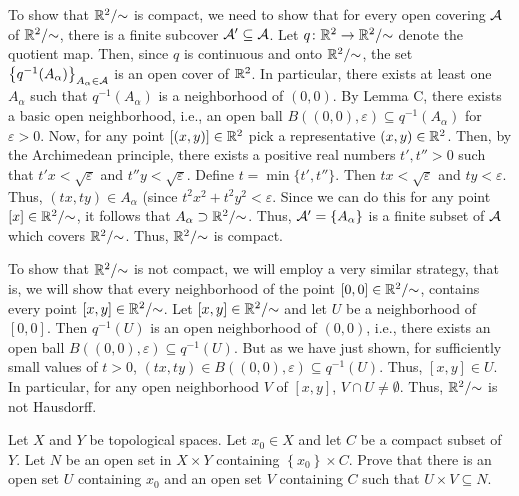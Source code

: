 \begin{solution}
  To show that \(\mathbb{R}^2/{\sim}\) is compact, we need to show that for every
  open covering \(\mathcal{A}\) of \(\mathbb{R}^2/{\sim}\), there is a finite subcover
  \(\mathcal{A}'\subseteq\mathcal{A}\). Let \(q\colon\mathbb{R}^2\to\mathbb{R}^2/{\sim}\) denote
  the quotient map. Then, since \(q\) is continuous and onto
  \(\mathbb{R}^2/{\sim}\), the set
  \(\left\{q^{-1}(A_\alpha)\right\}_{A_\alpha\in\mathcal{A}}\) is an open cover
  of \(\mathbb{R}^2\). In particular, there exists at least one \(A_\alpha\) such
  that \(q^{-1}(A_\alpha)\) is a neighborhood of \((0,0)\). By Lemma C,
  there exists a basic open neighborhood, i.e., an open ball
  \(B((0,0),\varepsilon)\subseteq q^{-1}(A_\alpha)\) for
  \(\varepsilon>0\). Now, for any point \([(x,y)]\in\mathbb{R}^2\) pick a
  representative \((x,y)\in\mathbb{R}^2\). Then, by the Archimedean principle,
  there exists a positive real numbers \(t',t''>0\) such that
  \(t'x<\sqrt{\varepsilon}\) and \(t''y<\sqrt{\varepsilon}\). Define
  \(t=\min\{t',t''\}\). Then \(tx<\sqrt{\varepsilon}\) and
  \(ty<\varepsilon\). Thus, \((tx,ty)\in A_\alpha\) (since
  \(t^2x^2+t^2y^2<\varepsilon\). Since we can do this for any point
  \([x]\in\mathbb{R}^2/{\sim}\), it follows that
  \(A_\alpha\supset\mathbb{R}^2/{\sim}\). Thus,
  \(\mathcal{A}'=\left\{A_\alpha\right\}\) is a finite subset of \(\mathcal{A}\) which
  covers \(\mathbb{R}^2/{\sim}\). Thus, \(\mathbb{R}^2/{\sim}\) is compact.

  To show that \(\mathbb{R}^2/{\sim}\) is not compact, we will employ a very
  similar strategy, that is, we will show that every neighborhood of the
  point \([0,0]\in\mathbb{R}^2/{\sim}\), contains every point
  \([x,y]\in\mathbb{R}^2/{\sim}\). Let \([x,y]\in\mathbb{R}^2/{\sim}\) and let \(U\) be
  a neighborhood of \([0,0]\). Then \(q^{-1}(U)\) is an open neighborhood
  of \((0,0)\), i.e., there exists an open ball
  \(B((0,0),\varepsilon)\subseteq q^{-1}(U)\). But as we have just shown,
  for sufficiently small values of \(t>0\),
  \((tx,ty)\in B((0,0),\varepsilon)\subseteq q^{-1}(U)\). Thus,
  \([x,y]\in U\). In particular, for any open neighborhood \(V\) of
  \([x,y]\), \(V\cap U\neq\emptyset\). Thus, \(\mathbb{R}^2/{\sim}\) is not
  Hausdorff.
\end{solution}
\begin{problem}
  Let \(X\) and \(Y\) be topological spaces. Let \(x_0\in X\) and let \(C\)
  be a compact subset of \(Y\). Let \(N\) be an open set in \(X\times Y\)
  containing \(\left\{x_0\right\}\times C\). Prove that there is an open
  set \(U\) containing \(x_0\) and an open set \(V\) containing \(C\) such
  that \(U\times V\subseteq N\).
\end{problem}

